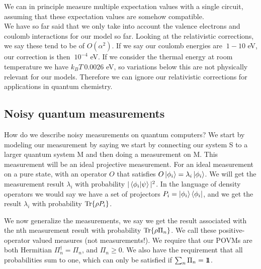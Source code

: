 We can in principle measure multiple expectation values with a single circuit, assuming that these expectation values are somehow compatible. \\
We have so far said that we only take into account the valence electrons and coulomb interactions for our model so far. Looking at the relativistic corrections, we say these tend to be of $O(\alpha^2)$.
If we say our coulomb energies are $~1-10$ eV, our correction is then $~10^{-4}$ eV. If we consider the thermal energy at room temperature we have $k_B T~0.0026$ eV, so variations below this are not physically relevant for our models.
Therefore we can ignore our relativistic corrections for applications in quantum chemistry.
\subsection{Noisy quantum measurements}
How do we describe noisy measurements on quantum computers? We start by modeling our measurement by saying we start by connecting our system S to a larger quantum system M and then doing a measurement on M. This measurement will be an ideal projective measurement.
For an ideal measurement on a pure state, with an operator $O$ that satisfies $O\ket{\phi_i} = \lambda_i \ket{\phi_i}$. We will get the measurement result $\lambda_i$ with probability $|\bra{\phi_i}\ket{\psi}|^2$.
In the language of density operators we would say we have a set of projectors $P_i = \ket{\phi_i}\bra{\phi_i}$, and we get the result $\lambda_i$ with probability $\Tr{\rho P_i}$.

We now generalize the measurements, we say we get the result associated with the nth measurement result with probability $\Tr{\rho\Pi_n}$. We call these positive-operator valued measures (not measurements!).
We require that our POVMs are both Hermitian $\Pi_n^\dagger = \Pi_n$, and $\Pi_n \geq 0$. We also have the requirement that all probabilities sum to one, which can only be satisfied if $\sum_n \Pi_n = 1\!\!1$.

